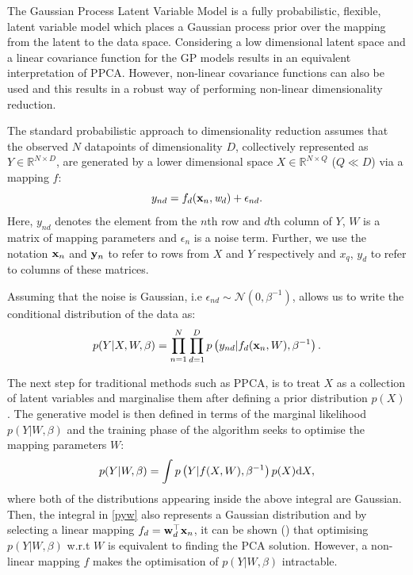 \documentclass [10pt , a4paper]{article}
\begin{document}
The Gaussian Process Latent Variable Model \cite{GPLVM, GPLVM2} is a fully probabilistic, flexible, latent variable model
which places a Gaussian process prior over the mapping from the latent to the data space.
Considering a low dimensional latent space and a linear covariance function for the GP models results in an
 equivalent interpretation of PPCA. However, non-linear covariance functions can also be used and this results
 in a robust way of performing non-linear dimensionality reduction.
\par The standard probabilistic approach to dimensionality reduction
 assumes that the observed $N$ datapoints of dimensionality $D$, collectively represented as
 $Y \in \mathbb{R}^{N \times D}$, are generated by a lower dimensional space
 $X \in \mathbb{R}^{N \times Q}$ ($Q \ll D$) via a mapping $f$:
\begin{equation}
\label{generative}
y_{nd} = f_d(\mathbf{x}_n, \mathit{w}_d) + \epsilon_{nd}.
\end{equation}
Here, $y_{nd}$ denotes the element from the $n$th row and $d$th column of $Y$, $W$ is a matrix of
mapping parameters and $\epsilon_n$ is a noise term. Further, we use the notation
$\mathbf{x}_n$ and $\mathbf{y}_n$ to refer to rows from $X$ and $Y$ respectively and $x_q$, $y_d$ to refer to columns of these matrices.

Assuming that the noise is Gaussian, i.e
 $\epsilon_{nd} \sim \mathcal{N}(0, \beta^{-1})$, allows us to write the conditional distribution of the data as:
$$
p(Y | X, W, \beta) = \prod_{n=1}^{N} \prod_{d=1}^{D} p \left( y_{nd} | f_d (\mathbf{x}_n, W), \beta^{-1} \right) .
$$

The next step for traditional methods such as PPCA, is to treat $X$ as a collection of latent variables and
 marginalise them after defining a prior distribution $p(X)$. The generative model is then defined in terms
 of the marginal likelihood $p(Y|W, \beta)$ and the training phase of the algorithm seeks to optimise the mapping parameters $W$:
\begin{equation}
\label{pyw}
p(Y | W, \beta) = \int p \left( Y | f(X, W), \beta^{-1} \right) p(X) \text{d} X ,
\end{equation}
where both of the distributions appearing inside the above integral are Gaussian. Then, the integral in \eqref{pyw}
 also represents a Gaussian distribution and by selecting a linear mapping $f_d = \mathbf{w}_d^{\top} \mathbf{x}_n$, it can be
 shown (\cite{ppca}) that optimising $p(Y | W, \beta)$ w.r.t $W$ is equivalent to finding the PCA solution. 
However, a non-linear mapping $f$ makes the optimisation of $p(Y | W, \beta)$ intractable.
\end{document}

